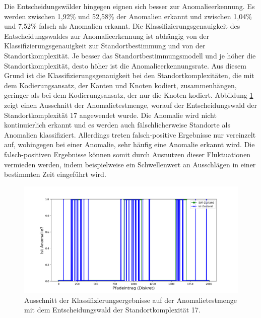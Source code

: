 \newpage
Die Entscheidungswälder hingegen eignen sich besser zur Anomalieerkennung.
Es werden zwischen 1,92\% und 52,58\% der Anomalien erkannt und zwischen 1,04\% und 7,52\% falsch als Anomalien erkannt.
Die Klassifizierungsgenauigkeit des Entscheidungswaldes zur Anomalieerkennung ist abhängig von der Klassifizierungsgenauigkeit zur Standortbestimmung
und von der Standortkomplexität.
Je besser das Standortbestimmungsmodell und je höher die Standortkomplexität, desto höher ist die Anomalieerkennungsrate.
Aus diesem Grund ist die Klassifizierungsgenauigkeit bei den Standortkomplexitäten, die mit dem Kodierungsansatz, der Kanten und Knoten kodiert, zusammenhängen,
geringer als bei dem Kodierungsansatz, der nur die Knoten kodiert.
\newline
\newline
Abbildung \ref{fig:true_vs_predicted_anomaly} zeigt einen Ausschnitt der Anomalietestmenge, worauf der Entscheidungswald der Standortkomplexität 17 angewendet wurde.
Die Anomalie wird nicht kontinuierlich erkannt und es werden auch fälschlicherweise Standorte als Anomalien klassifiziert.
Allerdings treten falsch-positive Ergebnisse nur vereinzelt auf, wohingegen bei einer Anomalie, sehr häufig eine Anomalie erkannt wird.
Die falsch-positiven Ergebnisse können somit durch Ausnutzen dieser Fluktuationen vermieden werden,
indem beispielweise ein Schwellenwert an Ausschlägen in einer bestimmten Zeit eingeführt wird.
\begin{figure}[h!]
    \centering
    \includegraphics[width=\linewidth]{images/anomaly_true_vs_predicted.png}
    \caption{Ausschnitt der Klassifizierungsergebnisse auf der Anomalietestmenge mit dem Entscheidungswald der Standortkomplexität 17. }
    \label{fig:true_vs_predicted_anomaly}
\end{figure}